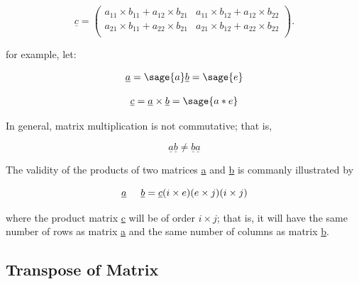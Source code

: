 \documentclass[12pt]{report}
\begin{document}
\begin{equation}
	\underline{c}=\left(\begin{array}{rrrrrr}
	a_{11} \times b_{11} + a_{12} \times b_{21} & a_{11} \times b_{12} + a_{12} \times b_{22}\\
	a_{21} \times b_{11} + a_{22} \times b_{21} & a_{21} \times b_{12} + a_{22} \times b_{22}\\
\end{array}\right).
\end{equation}

for example, let:

$$
\underline{a} = \sage{a}\nonumber 
\underline{b} = \sage{e}\nonumber
$$

\begin{eqnarray}
	\underline{c} =\underline{a} \times \underline{b} = \sage{a*e}
\end{eqnarray}

In general, matrix multiplication is not commutative; 
that is,

\begin{equation}
	\underline{a}\underline{b} \neq \underline{b}\underline{a}
\end{equation}

The validity of the products of two matrices \underline{a} and
\underline{b} is commanly illustrated by

\begin{equation} 
\underline{a} \hspace{0.5cm} \underline{b} = \underline{c} \nonumber \\
(i \times e)(e \times j) (i \times j) \label{eq:genmulti}
\end{equation}

where the product matrix \underline{c} will be of order $i \times j$;
that is, it will have the same number of rows as matrix \underline{a}
and the same number of columns as matrix \underline{b}.


\subsection{Transpose of Matrix}
\end{document}
